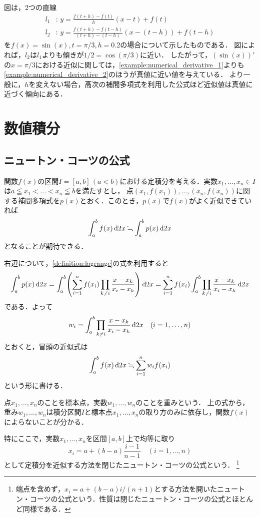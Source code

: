 \documentclass[a4paper]{ltjsarticle}
\theoremstyle{definition}
\DeclarePairedDelimiter{\pqty}{\lparen}{\rparen}
\newcommand{\dd}[1]{\dl2#1}
\begin{document}
図は，2つの直線
\begin{align*}
  l_1 &\colon\, y = \frac{f(t+h)-f(t)}{h} (x - t) + f(t) \\
  l_2 &\colon\, y = \frac{f(t+h)-f(t-h)}{(t+h)-(t-h)} (x - (t-h)) + f(t-h)
\end{align*}
を$f(x)=\sin(x), t=\pi/3, h=0.2$の場合について示したものである．
図によれば，$l_2$は$l_1$よりも傾きが$1/2 = \cos(\pi/3)$に近い．
したがって，$(\sin(x))'$の$x=\pi/3$における近似に関しては，\cref{example:numerical_derivative_1}よりも\cref{example:numerical_derivative_2}のほうが真値に近い値を与えている．
より一般に，$h$を変えない場合，高次の補間多項式を利用した公式ほど近似値は真値に近づく傾向にある．

\section{数値積分}
\subsection{ニュートン・コーツの公式}
\label{subsection:newton_cotes}
関数$f(x)$の区間$I = [a, b]\,(a<b)$における定積分を考える．実数$x_1,\dots,x_n \in I$は$a \leqq x_1 < \dots < x_n \leqq b$を満たすとし，
点$(x_1,f(x_1)),\dots,(x_n,f(x_n))$に関する補間多項式を$p(x)$とおく．このとき，$p(x)$で$f(x)$がよく近似できていれば
\[
  \int_a^b f(x) \dd{x} \fallingdotseq \int_a^b p(x) \dd{x}
\]
となることが期待できる．

右辺について，\cref{definition:lagrange}の式を利用すると
\[
  \int_a^b p(x) \dd{x}
  = \int_a^b \pqty*{\sum_{i=1}^n f(x_i) \prod_{k\neq i} \frac{x - x_k}{x_i - x_k}} \dd{x}
  = \sum_{i=1}^n f(x_i) \int_a^b \prod_{k\neq i} \frac{x - x_k}{x_i - x_k} \dd{x}
\]
である．よって
\[
  w_i = \int_a^b \prod_{k\neq i} \frac{x - x_k}{x_i - x_k} \dd{x} \quad (i=1,\dots,n)
\]
とおくと，冒頭の近似式は
\[
  \int_a^b f(x) \dd{x} \fallingdotseq \sum_{i=1}^n w_i f(x_i)
\]
という形に書ける．

点$x_1,\dots,x_n$のことを標本点，実数$w_1,\dots,w_n$のことを重みという．
上の式から，重み$w_1,\dots,w_n$は積分区間$I$と標本点$x_1,\dots,x_n$の取り方のみに依存し，関数$f(x)$によらないことが分かる．

特にここで，実数$x_1,\dots,x_n$を区間$[a,b]$上で均等に取り
\[
  x_i = a + (b-a)\frac{i-1}{n-1} \quad (i = 1,\dots,n)
\]
として定積分を近似する方法を閉じたニュートン・コーツの公式という．
\footnote{端点を含めず，$x_i = a + (b-a)i/(n+1)$とする方法を開いたニュートン・コーツの公式という．性質は閉じたニュートン・コーツの公式とほとんど同様である．}
\end{document}
